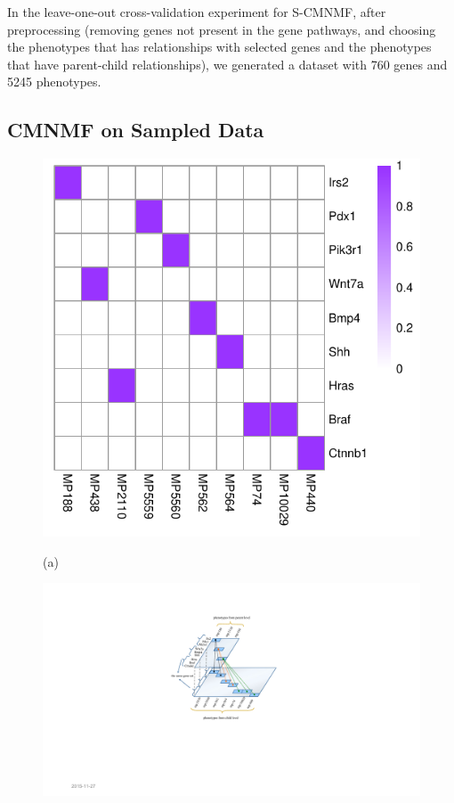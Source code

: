 \documentclass{bmcart}
\begin{document}
In the leave-one-out cross-validation experiment for S-CMNMF, after preprocessing (removing genes not present in the gene pathways, and choosing the phenotypes that has relationships with selected genes and the phenotypes that have parent-child relationships), we generated a dataset with 760 genes and 5245 phenotypes.
\subsection*{\textbf{CMNMF on Sampled Data}}
\begin{figure}[!h]
  \centering
  \begin{minipage}[b]{.40\linewidth}
   \includegraphics[width=\linewidth]{DrawPictures/v_4.pdf}
    \centerline{(a)}
  \end{minipage}
   \begin{minipage}[b]{.45\linewidth}
   \includegraphics[width=\linewidth]{DrawPictures/Hierarchica.pdf}

\end{minipage}
\end{figure}
\end{document}
